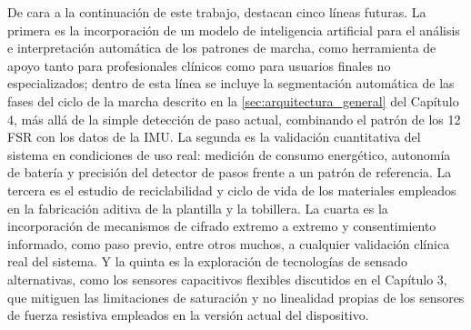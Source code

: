 \begin{IAtext}
De cara a la continuación de este trabajo, destacan cinco líneas futuras. La primera es la incorporación de un modelo de inteligencia artificial para el análisis e interpretación automática de los patrones de marcha, como herramienta de apoyo tanto para profesionales clínicos como para usuarios finales no especializados; dentro de esta línea se incluye la segmentación automática de las fases del ciclo de la marcha descrito en la \cref{sec:arquitectura_general} del Capítulo 4, más allá de la simple detección de paso actual, combinando el patrón de los 12 FSR con los datos de la IMU. La segunda es la validación cuantitativa del sistema en condiciones de uso real: medición de consumo energético, autonomía de batería y precisión del detector de pasos frente a un patrón de referencia. La tercera es el estudio de reciclabilidad y ciclo de vida de los materiales empleados en la fabricación aditiva de la plantilla y la tobillera. La cuarta es la incorporación de mecanismos de cifrado extremo a extremo y consentimiento informado, como paso previo, entre otros muchos, a cualquier validación clínica real del sistema. Y la quinta es la exploración de tecnologías de sensado alternativas, como los sensores capacitivos flexibles discutidos en el Capítulo 3, que mitiguen las limitaciones de saturación y no linealidad propias de los sensores de fuerza resistiva empleados en la versión actual del dispositivo.

\end{IAtext}